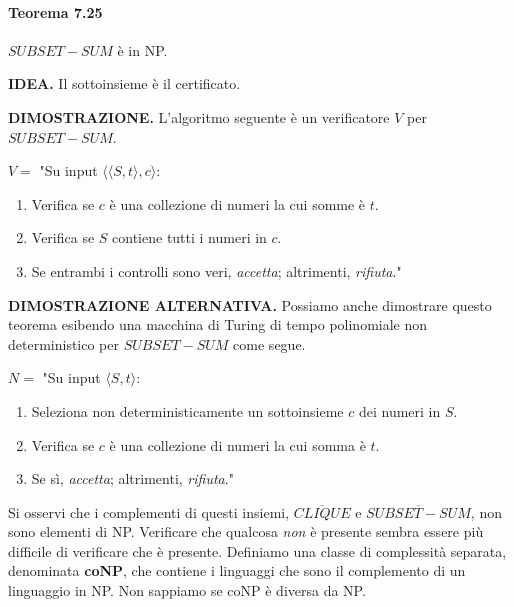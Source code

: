 \documentclass{article}
\begin{document}
\paragraph{Teorema 7.25}
\label{teorema-7.25}
\vspace{1em}
\text{}
\newline
$SUBSET-SUM$ è in NP.

\text{}
\newline
\textbf{IDEA.} Il sottoinsieme è il certificato.

\text{}
\newline
\textbf{DIMOSTRAZIONE.} L'algoritmo seguente è un verificatore $V$ per $SUBSET-SUM$.

\text{}
\newline
$V =$ "Su input $\langle \langle S, t \rangle, c \rangle$:
\begin{enumerate}
    \item Verifica se $c$ è una collezione di numeri la cui somme è $t$.
    \item Verifica se $S$ contiene tutti i numeri in $c$.
    \item Se entrambi i controlli sono veri, \textit{accetta}; altrimenti, \textit{rifiuta}."
\end{enumerate}
\vspace{1em}
\text{}
\newline
\textbf{DIMOSTRAZIONE ALTERNATIVA.} Possiamo anche dimostrare questo teorema esibendo una macchina di Turing di tempo polinomiale non deterministico per $SUBSET-SUM$ come segue.

\text{}
\newline
$N =$ "Su input $\langle S, t \rangle$:
\begin{enumerate}
    \item Seleziona non deterministicamente un sottoinsieme $c$ dei numeri in $S$.
    \item Verifica se $c$ è una collezione di numeri la cui somma è $t$.
    \item Se sì, \textit{accetta}; altrimenti, \textit{rifiuta}."
\end{enumerate}

\text{}
\newline
Si osservi che i complementi di questi insiemi, $\overline{CLIQUE}$ e $\overline{SUBSET-SUM}$, non sono elementi di NP. 
Verificare che qualcosa \textit{non} è presente sembra essere più difficile di verificare che è presente. 
Definiamo una classe di complessità separata, denominata \textbf{coNP}, che contiene i linguaggi che sono il complemento di un linguaggio in NP. 
Non sappiamo se coNP è diversa da NP.
\end{document}
